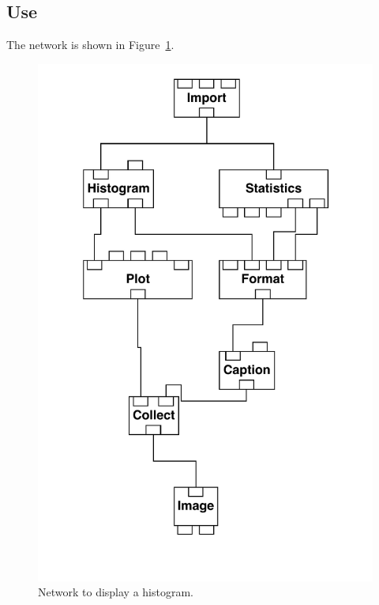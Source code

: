 \documentclass[twoside,11pt]{article}
\begin{document}
\subsection{Use}

The network is shown in Figure~\ref{HISTNETF}.

\begin{figure}[htbp]

\begin{center}
\leavevmode
\includegraphics[width=371pt]{sc2_histogram}
\end{center}

\caption[Network to display a histogram.]{Network to display a histogram.
\label{HISTNETF} }

\end{figure}
\end{document}
